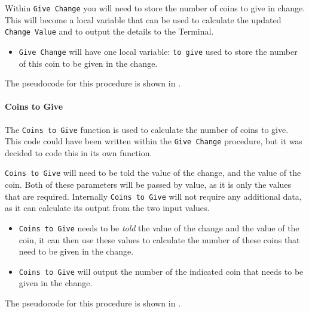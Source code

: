 Within \texttt{Give Change} you will need to store the number of coins to give in change. This will become a local variable that can be used to calculate the updated \texttt{Change Value} and to output the details to the Terminal.

\begin{itemize}
  \item \texttt{Give Change} will have one local variable: \texttt{to give} used to store the number of this coin to be given in the change.
\end{itemize}


The pseudocode for this procedure is shown in .



\paragraph{Coins to Give} %
\label{par:coins_to_give}
The \texttt{Coins to Give} function is used to calculate the number of coins to give. This code could have been written within the \texttt{Give Change} procedure, but it was decided to code this in its own function. 

\texttt{Coins to Give} will need to be told the value of the change, and the value of the coin. Both of these parameters will be passed by value, as it is only the values that are required. Internally \texttt{Coins to Give} will not require any additional data, as it can calculate its output from the two input values.

\begin{itemize}
  \item \texttt{Coins to Give} needs to be \emph{told} the value of the change and the value of the coin, it can then use these values to calculate the number of these coins that need to be given in the change.
  \item \texttt{Coins to Give} will output the number of the indicated coin that needs to be given in the change.
\end{itemize}


The pseudocode for this procedure is shown in .


